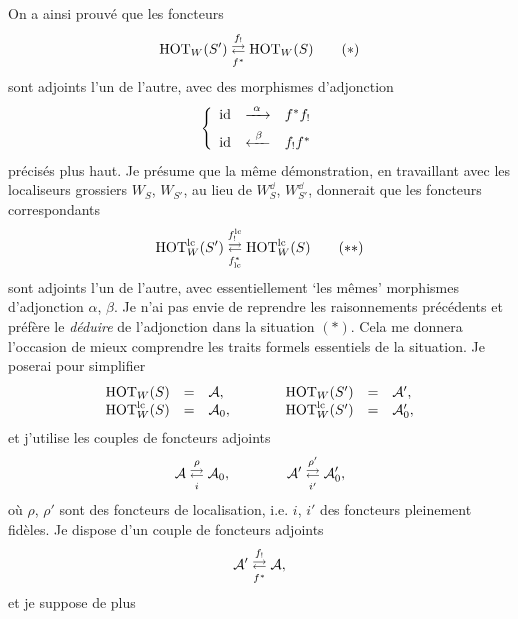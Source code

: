 
On a ainsi prouvé que les foncteurs
\[
\HOT_W(S') \adj{f_!}{f^*} \HOT_W(S)
\tag*{$(*)$}
\]
sont adjoints l'un de l'autre, avec des morphismes d'adjonction
\[
\left\{
\begin{array}{lcl}
\id & \xrightarrow{\ \alpha\ } & f^*f_! \\[1ex]
\id & \xleftarrow{\ \beta\ } & f_!f^*
\end{array}
\right.
\]
précisés plus haut. Je présume que la même démonstration, en travaillant avec les localiseurs grossiers $W_S$, $W_{S'}$, au lieu de $W^{\dd}_S$, $W^{\dd}_{S'}$, donnerait que les foncteurs correspondants
\[
\HOT^{\lc}_W(S') \adj{f_!^{\lc}}{f^*_{\lc}} \HOT^{\lc}_W(S)
\tag*{$(**)$}
\]
sont adjoints l'un de l'autre, avec essentiellement ‘les mêmes’ morphismes d'adjonction $\alpha$, $\beta$. Je n'ai pas envie de reprendre les raisonnements précédents et préfère le \textit{déduire} de l'adjonction dans la situation $(*)$. Cela me donnera l'occasion de mieux comprendre les traits formels essentiels de la situation. Je poserai pour simplifier
\[
\begin{array}{rcl@{\qquad\qquad}rcl}
\HOT_W(S) & = & \cA, & \HOT_W(S') & = & \cA', \\
\HOT^{\lc}_W(S) & = & \cA_0, & \HOT^{\lc}_W(S') & = & \cA'_0,
\end{array}
\]
et j'utilise les couples de foncteurs adjoints
\[
\cA \adj{\rho}{i} \cA_0, \qquad\qquad \cA' \adj{\rho'}{i'} \cA'_0,
\]
où $\rho$, $\rho'$ sont des foncteurs de localisation, i.e. $i$, $i'$ des foncteurs pleinement fidèles. Je dispose d'un couple de foncteurs adjoints
\[
\cA' \adj{f_!}{f^*} \cA,
\]
et je suppose de plus

